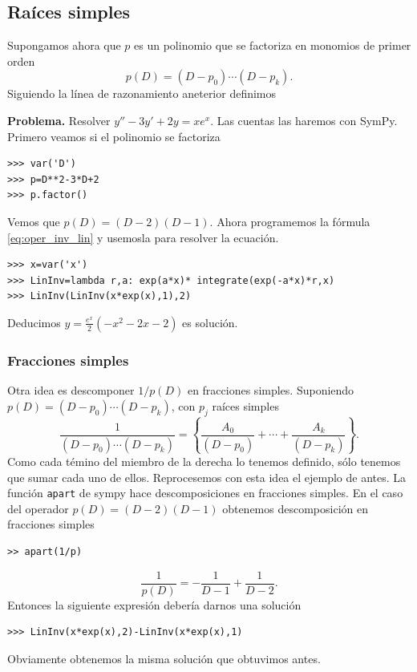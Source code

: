 \subsection{Raíces simples}
Supongamos ahora que $p$ es un polinomio que se factoriza en monomios de primer orden
\[p(D)=(D-p_0)\cdots(D-p_k).\]
Siguiendo la línea de razonamiento aneterior
definimos


\noindent\textbf{Problema.} Resolver  $y''-3y'+2y=xe^x$. Las cuentas las haremos con SymPy. Primero veamos si el polinomio se factoriza



\begin{lstlisting}
>>> var('D')
>>> p=D**2-3*D+2
>>> p.factor()
\end{lstlisting}

Vemos que $p(D)=(D-2)(D-1)$. Ahora programemos la fórmula \eqref{eq:oper_inv_lin} y usemosla para resolver la ecuación.
\begin{lstlisting}
>>> x=var('x')
>>> LinInv=lambda r,a: exp(a*x)* integrate(exp(-a*x)*r,x)
>>> LinInv(LinInv(x*exp(x),1),2)
\end{lstlisting}
Deducimos $y=\frac{e^{x}}{2} \left(- x^{2} - 2 x - 2\right)
$ es solución.



\subsubsection{Fracciones simples}
 Otra idea es descomponer $1/p(D)$ en fracciones simples. Suponiendo $p(D)=(D-p_0)\cdots(D-p_k)$, con $p_j$ raíces simples
\[\frac{1}{(D-p_0)\cdots(D-p_k)}=\left\{\frac{A_0}{(D-p_0)}+\cdots+\frac{A_k}{(D-p_k)}\right\}.\]
Como cada témino del miembro de la derecha lo tenemos definido, sólo tenemos que sumar cada uno de ellos. Reprocesemos con esta idea el  ejemplo de antes. La función \texttt{apart} de sympy hace descomposiciones en fracciones simples. En el caso del operador $p(D)=(D-2)(D-1)$ obtenemos descomposición en fracciones simples
\begin{lstlisting}
>> apart(1/p)
\end{lstlisting}

\[\frac{1}{p(D)}=-\frac{1}{D-1}+\frac{1}{D-2}.\]
 Entonces la siguiente expresión debería darnos una solución
\begin{lstlisting}
>>> LinInv(x*exp(x),2)-LinInv(x*exp(x),1)
\end{lstlisting}
Obviamente obtenemos la misma solución que obtuvimos antes.

